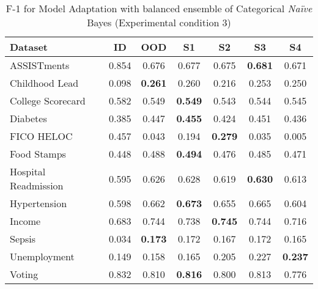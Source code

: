 \vspace{10pt}
\begin{table}[h!]
\centering
\caption{F-1 for Model Adaptation with balanced ensemble of Categorical \textit{Na\"ive} Bayes (Experimental condition 3)}
\begin{tabular}{lcccccc}
\toprule
{Dataset} & {ID} & {OOD} & {S1} & {S2} & {S3} & {S4} \\
\midrule
ASSISTments & 0.854 & 0.676 & 0.677 & 0.675 & \bfseries 0.681 & 0.671 \\
Childhood Lead & 0.098 & \bfseries 0.261 & 0.260 & 0.216 & 0.253 & 0.250 \\
College Scorecard & 0.582 & 0.549 & \bfseries 0.549 & 0.543 & 0.544 & 0.545 \\
Diabetes & 0.385 & 0.447 & \bfseries 0.455 & 0.424 & 0.451 & 0.436 \\
FICO HELOC & 0.457 & 0.043 & 0.194 & \bfseries 0.279 & 0.035 & 0.005 \\
Food Stamps & 0.448 & 0.488 & \bfseries 0.494 & 0.476 & 0.485 & 0.471 \\
Hospital Readmission & 0.595 & 0.626 & 0.628 & 0.619 & \bfseries 0.630 & 0.613 \\
Hypertension & 0.598 & 0.662 & \bfseries 0.673 & 0.655 & 0.665 & 0.604 \\
Income & 0.683 & 0.744 & 0.738 & \bfseries 0.745 & 0.744 & 0.716 \\
Sepsis & 0.034 & \bfseries 0.173 & 0.172 & 0.167 & 0.172 & 0.165 \\
Unemployment & 0.149 & 0.158 & 0.165 & 0.205 & 0.227 & \bfseries 0.237 \\
Voting & 0.832 & 0.810 & \bfseries 0.816 & 0.800 & 0.813 & 0.776 \\
\bottomrule
\end{tabular}
\end{table}

\vspace{10pt}
